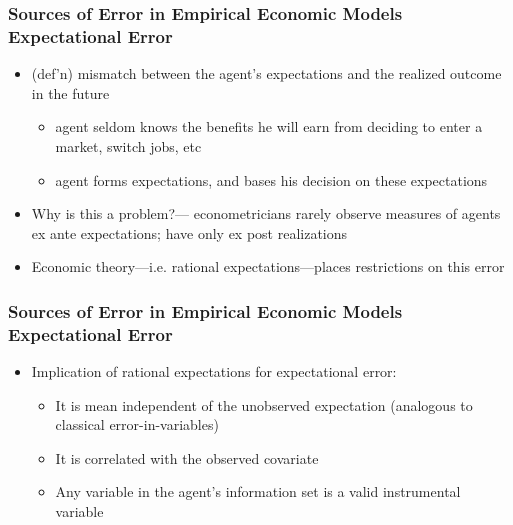 \documentclass[10pt,letterpaper]{beamer}
\begin{document}

\begin{frame}
\frametitle{{Sources of Error in Empirical Economic Models}\\{Expectational
Error}}

\begin{itemize}
\item (def'n) mismatch between the agent's expectations and the realized
outcome in the future 

\begin{itemize}
\item agent seldom knows the benefits he will earn from deciding to enter a
market, switch jobs, etc 

\item agent forms expectations, and bases his decision on these expectations 
\end{itemize}

\item Why is this a problem?--- econometricians rarely observe measures of
agents ex ante expectations; have only ex post realizations

\item Economic theory---i.e. rational expectations---places restrictions on
this error
\end{itemize}
\end{frame}



\begin{frame}
\frametitle{{Sources of Error in Empirical Economic Models}\\{Expectational
Error}}

\begin{itemize}
\item Implication of rational expectations for expectational error: 

\begin{itemize}
\item It is mean independent of the unobserved expectation (analogous to
classical error-in-variables) 

\item It is correlated with the observed covariate 

\item Any variable in the agent's information set is a valid instrumental
variable 
\end{itemize}
\end{itemize}
\end{frame}
\end{document}
